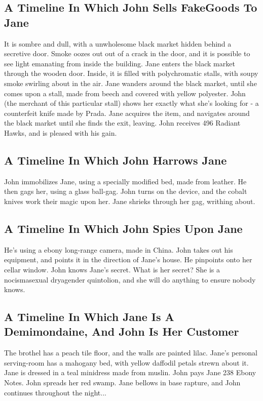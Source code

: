 \documentclass{article}
\begin{document}
\subsection{A Timeline In Which John Sells FakeGoods To Jane}


It is sombre and dull, with a unwholesome black market hidden behind a secretive door.
Smoke oozes out out of a crack in the door, and it is possible to see light emanating from inside the building.
Jane enters the black market through the wooden door.
Inside, it is filled with polychromatic stalls, with soupy smoke swirling about in the air.
Jane wanders around the black market, until she comes upon a stall, made from beech and covered with yellow polyester.
John (the merchant of this particular stall) shows her exactly what she's looking for {-} a counterfeit knife made by Prada.
Jane acquires the item, and navigates around the black market until she finds the exit, leaving.
John receives 496 Radiant Hawks, and is pleased with his gain.
\subsection{A Timeline In Which John Harrows Jane}


John immobilizes Jane, using a specially modified bed, made from leather.
He then gags her, using a glass ball{-}gag.
John turns on the device, and the cobalt knives work their magic upon her.
Jane shrieks through her gag, writhing about.
\subsection{A Timeline In Which John Spies Upon Jane}


He's using a ebony long{-}range camera, made in China.
John takes out his equipment, and points it in the direction of Jane's house. He pinpoints onto her cellar window.
John knows Jane's secret. What is her secret? She is a nocismasexual dryagender quintolion, and she will do anything to ensure nobody knows.
\subsection{A Timeline In Which Jane Is A Demimondaine, And John Is Her Customer}


The brothel has a peach tile floor, and the walls are painted lilac.
Jane's personal serving{-}room has a mahogany bed, with yellow daffodil petals strewn about it.
Jane is dressed in a teal minidress made from muslin.
John pays Jane 238 Ebony Notes.
John spreads her red swamp.
Jane bellows in base rapture, and John continues throughout the night...
\end{document}
